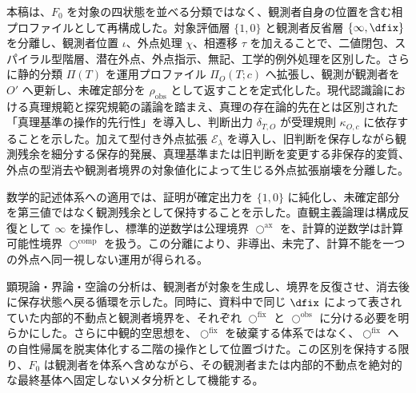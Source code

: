 \documentclass[a4paper,11pt]{ltjsarticle}
\theoremstyle{definition}
\theoremstyle{plain}
\newcommand{\Phase}{\Pi}
\newcommand{\ofix}{\bigcirc^{\mathrm{fix}}}
\newcommand{\oobs}{\bigcirc^{\mathrm{obs}}}
\newcommand{\oax}{\bigcirc^{\mathrm{ax}}}
\newcommand{\ocomp}{\bigcirc^{\mathrm{comp}}}
\newcommand{\Residual}{\rho_{\mathrm{obs}}}
\newcommand{\TruthCriterion}{\kappa}
\newcommand{\CircleExt}{\mathcal{E}}
\begin{document}
本稿は、$F_0$ を対象の四状態を並べる分類ではなく、観測者自身の位置を含む相プロファイルとして再構成した。対象評価層 $\{1,0\}$ と観測者反省層 $\{\infty,\dfix\}$ を分離し、観測者位置 $\iota$、外点処理 $\chi$、相遷移 $\tau$ を加えることで、二値閉包、スパイラル型階層、潜在外点、外点指示、無記、工学的例外処理を区別した。さらに静的分類 $\Phase(T)$ を運用プロファイル $\Phase_O(T;c)$ へ拡張し、観測が観測者を $O'$ へ更新し、未確定部分を $\Residual$ として返すことを定式化した。現代認識論における真理規範と探究規範の議論を踏まえ、真理の存在論的先在とは区別された「真理基準の操作的先行性」を導入し、判断出力 $\delta_{T,O}$ が受理規則 $\TruthCriterion_{O,c}$ に依存することを示した。加えて型付き外点拡張 $\CircleExt_\lambda$ を導入し、旧判断を保存しながら観測残余を細分する保存的発展、真理基準または旧判断を変更する非保存的変質、外点の型消去や観測者境界の対象値化によって生じる外点拡張崩壊を分離した。

数学的記述体系への適用では、証明が確定出力を $\{1,0\}$ に純化し、未確定部分を第三値ではなく観測残余として保持することを示した。直観主義論理は構成反復として $\infty$ を操作し、標準的逆数学は公理境界 $\oax$ を、計算的逆数学は計算可能性境界 $\ocomp$ を扱う。この分離により、非導出、未完了、計算不能を一つの外点へ同一視しない運用が得られる。

顕現論・界論・空論の分析は、観測者が対象を生成し、境界を反復させ、消去後に保存状態へ戻る循環を示した。同時に、資料中で同じ $\dfix$ によって表されていた内部的不動点と観測者境界を、それぞれ $\ofix$ と $\oobs$ に分ける必要を明らかにした。さらに中観的空思想を、$\ofix$ を破棄する体系ではなく、$\ofix$ への自性帰属を脱実体化する二階の操作として位置づけた。この区別を保持する限り、$F_0$ は観測者を体系へ含めながら、その観測者または内部的不動点を絶対的な最終基体へ固定しないメタ分析として機能する。



\end{document}
